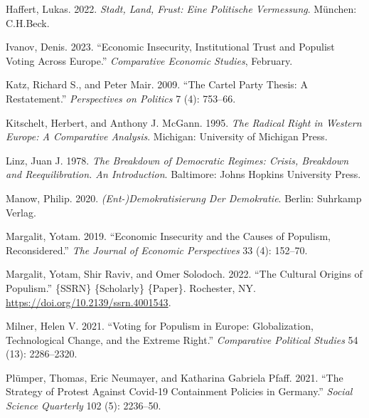 \documentclass[
]{article}
\newlength{\cslhangindent}
\newlength{\cslentryspacingunit} %
\newenvironment{CSLReferences}[2] %
 {%
  \setlength{\parindent}{0pt}
  \ifodd #1
  \let\oldpar\par
  \def\par{\hangindent=\cslhangindent\oldpar}
  \fi
  \setlength{\parskip}{#2\cslentryspacingunit}
 }%
 {}
\begin{document}
\begin{CSLReferences}{1}{0}
\leavevmode{}%
Haffert, Lukas. 2022. \emph{Stadt, {Land}, {Frust}: {Eine} Politische
{Vermessung}}. München: C.H.Beck.

\leavevmode{}%
Ivanov, Denis. 2023. {``Economic {Insecurity}, {Institutional} {Trust}
and {Populist} {Voting} {Across} {Europe}.''} \emph{Comparative Economic
Studies}, February.

\leavevmode{}%
Katz, Richard S., and Peter Mair. 2009. {``The {Cartel} {Party}
{Thesis}: {A} {Restatement}.''} \emph{Perspectives on Politics} 7 (4):
753--66.

\leavevmode{}%
Kitschelt, Herbert, and Anthony J. McGann. 1995. \emph{The {Radical}
{Right} in {Western} {Europe}: {A} {Comparative} {Analysis}}. Michigan:
University of Michigan Press.

\leavevmode{}%
Linz, Juan J. 1978. \emph{The {Breakdown} of {Democratic} {Regimes}:
{Crisis}, {Breakdown} and {Reequilibration}. {An} {Introduction}}.
Baltimore: Johns Hopkins University Press.

\leavevmode{}%
Manow, Philip. 2020. \emph{({Ent}-){Demokratisierung} Der {Demokratie}}.
Berlin: Suhrkamp Verlag.

\leavevmode{}%
Margalit, Yotam. 2019. {``Economic {Insecurity} and the {Causes} of
{Populism}, {Reconsidered}.''} \emph{The Journal of Economic
Perspectives} 33 (4): 152--70.

\leavevmode{}%
Margalit, Yotam, Shir Raviv, and Omer Solodoch. 2022. {``The {Cultural}
{Origins} of {Populism}.''} \{SSRN\} \{Scholarly\} \{Paper\}. Rochester,
NY. \url{https://doi.org/10.2139/ssrn.4001543}.

\leavevmode{}%
Milner, Helen V. 2021. {``Voting for {Populism} in {Europe}:
{Globalization}, {Technological} {Change}, and the {Extreme} {Right}.''}
\emph{Comparative Political Studies} 54 (13): 2286--2320.

\leavevmode{}%
Plümper, Thomas, Eric Neumayer, and Katharina Gabriela Pfaff. 2021.
{``The Strategy of Protest Against {Covid}-19 Containment Policies in
{Germany}.''} \emph{Social Science Quarterly} 102 (5): 2236--50.


\end{CSLReferences}
\end{document}
